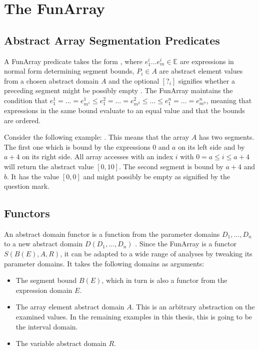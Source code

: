 \section{The FunArray}

\subsection{Abstract Array Segmentation Predicates}



A FunArray predicate takes the form , where $e^i_1\ldots e^i_m\in\mathbb{E}$ are expressions in normal form determining segment bounds, $P_i\in A$ are abstract element values from a chosen abstract domain $A$ and the optional $[?_i]$ signifies whether a preceding segment might be possibly empty \cite{cousot2011}. The FunArray maintains the condition that $e_1^1=\ldots=e_{m^1}^1\leq e_1^2=\ldots=e_{m^2}^2\leq\ldots\leq e_1^n=\ldots=e_{m^n}^n$, meaning that expressions in the same bound evaluate to an equal value and that the bounds are ordered. 


Consider the following example: . This means that the array $A$ has two segments. The first one which is bound by the expressions $0$ and $a$ on its left side and by $a+4$ on its right side. All array accesses with an index $i$ with $0=a\leq i \leq a+ 4$ will return the abstract value $[0,10]$. The second segment is bound by $a+4$ and $b$. It has the value $[0,0]$ and might possibly be empty as signified by the question mark.


\subsection{Functors}

An abstract domain functor is a function from the parameter domains $D_1,\ldots,D_n$ to a new abstract domain $D(D_1,\ldots,D_n)$ \cite{cousot2011}.
Since the FunArray is a functor $S(B(E),A,R)$, it can be adapted to a wide range of analyses by tweaking its parameter domains. It takes the following domains as arguments:
\begin{itemize}[label={--}]
	\item The segment bound $B(E)$, which in turn is also a functor from the expression domain $E$.
	\item The array element abstract domain $A$. This is an arbitrary abstraction on the examined values. In the remaining examples in this thesis, this is going to be the interval domain.
	\item The variable abstract domain $R$.
\end{itemize} 

